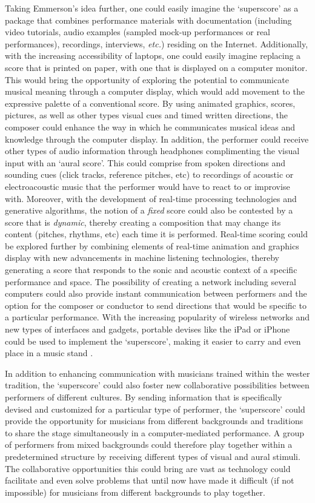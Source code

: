 Taking Emmerson's idea further, one could easily imagine the `superscore' as a package that combines performance materials with documentation (including video tutorials, audio examples (sampled mock-up performances or real performances), recordings, interviews, \emph{etc.}) residing on the Internet. Additionally, with the increasing accessibility of laptops, one could easily imagine replacing a score that is printed on paper, with one that is displayed on a computer monitor. This would bring the opportunity of exploring the potential to communicate musical meaning through a computer display, which would add movement to the expressive palette of a conventional score. By using animated graphics, scores, pictures, as well as other types visual cues and timed written directions, the composer could enhance the way in which he communicates musical ideas and knowledge through the computer display. In addition, the performer could receive other types of audio information through headphones complimenting the visual input with an `aural score'. This could comprise from spoken directions and sounding cues (click tracks, reference pitches, etc) to recordings of acoustic or electroacoustic music that the performer would have to react to or improvise with. Moreover, with the development of real-time processing technologies and generative algorithms, the notion of a \emph{fixed} score could also be contested by a score that is \emph{dynamic}, thereby creating a composition that may change its content (pitches, rhythms, etc) each time it is performed. Real-time scoring could be explored further by combining elements of real-time animation and graphics display with new advancements in machine listening technologies, thereby generating a score that responds to the sonic and acoustic context of a specific performance and space. The possibility of creating a network including several computers could also provide instant communication between performers and the option for the composer or conductor to send directions that would be specific to a particular performance. With the increasing popularity of wireless networks and new types of interfaces and gadgets, portable devises like the iPad or iPhone could be used to implement the `superscore', making it easier to carry and even place in a music stand . 

In addition to enhancing communication with musicians trained within the wester tradition, the `superscore' could also foster new collaborative possibilities between performers of different cultures. By sending information that is specifically devised and customized for a particular type of performer, the `superscore' could provide the opportunity for musicians from different backgrounds and traditions to share the stage simultaneously in a computer-mediated performance. A group of performers from mixed backgrounds could therefore play together within a predetermined structure by receiving different types of visual and aural stimuli. The collaborative opportunities this could bring are vast as technology could facilitate and even solve problems that until now have made it difficult (if not impossible) for musicians from different backgrounds to play together.  

